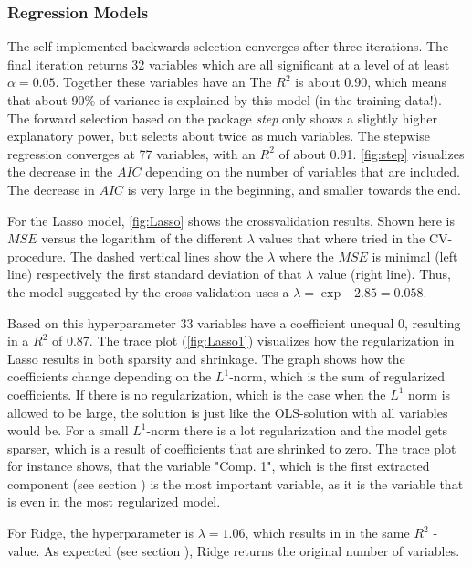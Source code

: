 
\subsubsection{Regression Models}
The self implemented backwards selection converges after three iterations. The final iteration returns 32 variables which are all significant at a level of at least $\alpha=0.05$. Together these variables have an 
The $R^{2}$ is about 0.90, which means that about 90\% of variance is explained by this model (in the training data!).
The forward selection based on the package \textit{step} only shows a slightly higher explanatory power, but selects about twice as much variables.  The stepwise regression converges at 77 variables, with an $R^{2}$ of about 0.91. 
\autoref{fig:step} visualizes the decrease in the $AIC$ depending on the number of variables that are included. The decrease in $AIC$ is very large in the beginning, and smaller towards the end. 


For the Lasso model, \autoref{fig:Lasso} shows the crossvalidation results. Shown here is  $MSE$ versus the logarithm of the different $\lambda$ values that where tried in the CV-procedure. The dashed vertical lines show the $\lambda$ where the $MSE$ is minimal (left line) respectively the first standard deviation of that $\lambda$ value (right line). Thus, the model suggested by the cross validation uses a $\lambda = \exp{-2.85}=0.058$. 

Based on this hyperparameter 33 variables have a coefficient unequal $0$, resulting in a $R^{2}$ of 0.87. 
The trace plot (\autoref{fig:Lasso1}) visualizes how the regularization in Lasso results in both sparsity and shrinkage. The graph shows how the coefficients change depending on the $L^{1}$-norm, which is the sum of regularized coefficients. If there is no regularization, which is the case when the $L^{1}$ norm is allowed to be large,  the solution is just like the OLS-solution with all variables would be. For a small $L^{1}$-norm there is a lot regularization and the model gets sparser, which is a result of coefficients that are shrinked to zero. The trace plot for instance shows, that the variable  "Comp. 1", which is the first extracted component (see section ) is the most important variable, as it is the variable that is even in the most regularized model.

For Ridge, the hyperparameter is $\lambda = 1.06$, which results in in the same $R^{2}$ -value. As expected (see section ), Ridge returns the original number of variables. 

